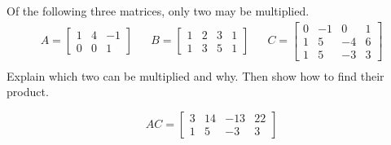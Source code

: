 
\begin{exerciseStatement}


Of the following three matrices, only two may be multiplied. 
\begin{align*} A= \left[\begin{array}{ccc}
1 & 4 & -1 \\
0 & 0 & 1
\end{array}\right]  & & B= \left[\begin{array}{cccc}
1 & 2 & 3 & 1 \\
1 & 3 & 5 & 1
\end{array}\right]  & & C= \left[\begin{array}{cccc}
0 & -1 & 0 & 1 \\
1 & 5 & -4 & 6 \\
1 & 5 & -3 & 3
\end{array}\right]  \\ \end{align*}
             Explain which two can be multiplied and why. Then show how to find their product.


\end{exerciseStatement}
    
\begin{exerciseAnswer} 
\[AC= \left[\begin{array}{cccc}
3 & 14 & -13 & 22 \\
1 & 5 & -3 & 3
\end{array}\right] \]
\end{exerciseAnswer}
    
